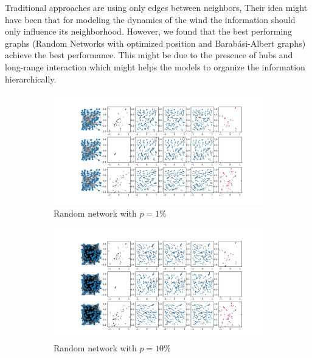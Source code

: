 \documentclass[a4paper,10pt]{article}
\begin{document}
Traditional approaches are using only edges between neighbors, Their idea might have been that for modeling the dynamics of the wind the information should only influence its neighborhood. However, we found that the best performing graphs (Random Networks with optimized position and Barab\'asi-Albert graphs) achieve the best performance. This might be due to the presence of hubs and long-range interaction which might helps the models to organize the information hierarchically.


\begin{figure}[htbp]
  \begin{subfigure}{0.24\textwidth}
    \centering
    \includegraphics[trim={0 13.2cm 29.35cm 0},clip,width=\textwidth]{../results/pdfs/rn1-100N-noemb-fixed}
    \caption{Random network with $p=1\%$}
  \end{subfigure}
  \begin{subfigure}{0.24\textwidth}
    \centering
    \includegraphics[trim={0 13.2cm 29.35cm 0},clip,width=\textwidth]{../results/pdfs/rn10-100N-noemb-fixed}
    \caption{Random network with $p=10\%$}
  \end{subfigure}
  \begin{subfigure}{0.24\textwidth}

\end{subfigure}
\end{figure}
\end{document}

